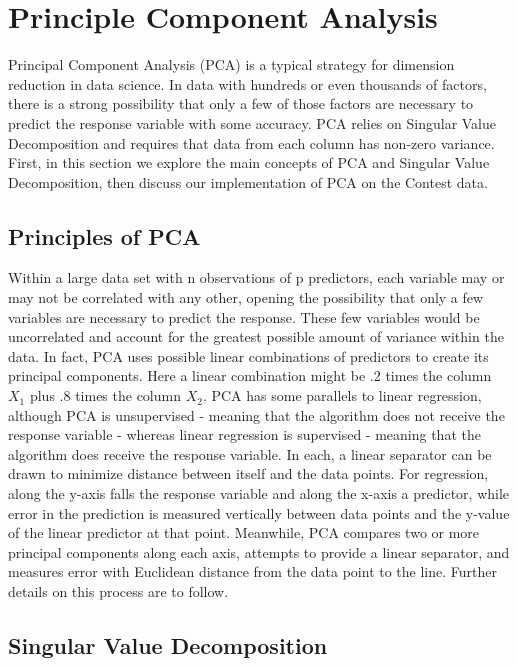 \usepackage{amsmath}
\section{Principle Component Analysis}

Principal Component Analysis (PCA) is a typical strategy for dimension reduction in data science. In data with hundreds or even thousands of factors, there is a strong possibility that only a few of those factors are necessary to predict the response variable with some accuracy. PCA relies on Singular Value Decomposition and requires that data from each column has non-zero variance. First, in this section we explore the main concepts of PCA and Singular Value Decomposition, then discuss our implementation of PCA on the Contest data.\newline

\subsection{Principles of PCA}

Within a large data set with n observations of p predictors, each variable may or may not be correlated with any other, opening the possibility that only a few variables are necessary to predict the response. These few variables would be uncorrelated and account for the greatest possible amount of variance within the data. In fact, PCA uses possible linear combinations of predictors to create its principal components. Here a linear combination might be .2 times the column $X_{1}$ plus .8 times the column $X_{2}$. PCA has some parallels to linear regression, although PCA is unsupervised - meaning that the algorithm does not receive the response variable - whereas linear regression is supervised - meaning that the algorithm does receive the response variable. In each, a linear separator can be drawn to minimize distance between itself and the data points. For regression, along the y-axis falls the response variable and along the x-axis a predictor, while error in the prediction is measured vertically between data points and the y-value of the linear predictor at that point. Meanwhile, PCA compares two or more principal components along each axis, attempts to provide a linear separator, and measures error with Euclidean distance from the data point to the line. Further details on this process are to follow. 

\subsection{Singular Value Decomposition}

